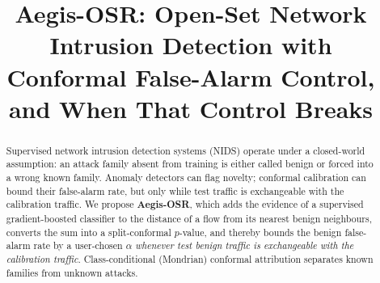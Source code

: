 \documentclass[conference]{IEEEtran}
\begin{document}
\title{Aegis-OSR: Open-Set Network Intrusion Detection with Conformal False-Alarm Control, and When That Control Breaks}

\author{
}

\maketitle

\begin{abstract}
Supervised network intrusion detection systems (NIDS) operate under a closed-world assumption: an attack family absent from training is either called benign or forced into a wrong known family. Anomaly detectors can flag novelty; conformal calibration can bound their false-alarm rate, but only while test traffic is exchangeable with the calibration traffic. We propose \textbf{Aegis-OSR}, which adds the evidence of a supervised gradient-boosted classifier to the distance of a flow from its nearest benign neighbours, converts the sum into a split-conformal $p$-value, and thereby bounds the benign false-alarm rate by a user-chosen $\alpha$ \emph{whenever test benign traffic is exchangeable with the calibration traffic}. Class-conditional (Mondrian) conformal attribution separates known families from unknown attacks.


\end{abstract}
\end{document}
